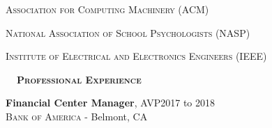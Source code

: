 \documentclass[hidelinks, 10.5pt]{article}
\def\contentwidth{0.9\linewidth}    %
\def\contentheaderspacing{1mm}      %
\def\sectionspacing{8mm}            %
\def\sectiontocontentspacing{4mm}   %
\renewcommand{\section}[1]{
    {\fontsize{14}{14}\selectfont \textsc{\textbf{\ \ #1\ \ }}}\hrulefill
}
\begin{document}
{\vspace{0.5mm}

\begin{minipage}[ct]{\contentwidth}
    \textsc{Association for Computing Machinery} (ACM)
\end{minipage}

\vspace{0.5mm}

\begin{minipage}[ct]{\contentwidth}
    \textsc{National Association of School Psychologists} (NASP)
\end{minipage}

\vspace{0.5mm}

\begin{minipage}[ct]{\contentwidth}
    \textsc{Institute of Electrical and Electronics Engineers} (IEEE)
\end{minipage}

\vspace{-2mm}



\vspace{\sectionspacing}
\section{Professional Experience}

\vspace{\sectiontocontentspacing}

\begin{minipage}[ct]{\contentwidth}
    \textbf{Financial Center Manager}, AVP\hfill 2017 to 2018\\
    {\textsc{Bank of America} - Belmont, CA}
\end{minipage}

}
\end{document}
